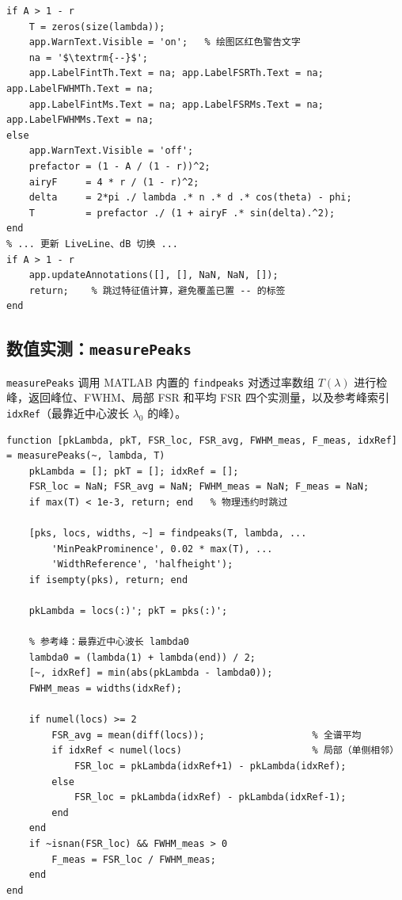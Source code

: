 \documentclass[10.5pt]{config}
\begin{document}
\begin{listing}[H]
\begin{verbatim}
if A > 1 - r
    T = zeros(size(lambda));
    app.WarnText.Visible = 'on';   % 绘图区红色警告文字
    na = '$\textrm{--}$';
    app.LabelFintTh.Text = na; app.LabelFSRTh.Text = na; app.LabelFWHMTh.Text = na;
    app.LabelFintMs.Text = na; app.LabelFSRMs.Text = na; app.LabelFWHMMs.Text = na;
else
    app.WarnText.Visible = 'off';
    prefactor = (1 - A / (1 - r))^2;
    airyF     = 4 * r / (1 - r)^2;
    delta     = 2*pi ./ lambda .* n .* d .* cos(theta) - phi;
    T         = prefactor ./ (1 + airyF .* sin(delta).^2);
end
% ... 更新 LiveLine、dB 切换 ...
if A > 1 - r
    app.updateAnnotations([], [], NaN, NaN, []);
    return;    % 跳过特征值计算，避免覆盖已置 -- 的标签
end
\end{verbatim}
\caption{物理合法性守卫：$A>1-r$ 时输出零线、显示警告并提前返回\label{lst:guard}}
\end{listing}

\subsection{数值实测：\texttt{measurePeaks}}
\label{ssec:measure}

\texttt{measurePeaks} 调用 MATLAB 内置的 \texttt{findpeaks} 对透过率数组 $T(\lambda)$ 进行检峰，返回峰位、FWHM、局部 FSR 和平均 FSR 四个实测量，以及参考峰索引 \texttt{idxRef}（最靠近中心波长 $\lambda_0$ 的峰）。

\begin{listing}[H]
\begin{verbatim}
function [pkLambda, pkT, FSR_loc, FSR_avg, FWHM_meas, F_meas, idxRef] = measurePeaks(~, lambda, T)
    pkLambda = []; pkT = []; idxRef = [];
    FSR_loc = NaN; FSR_avg = NaN; FWHM_meas = NaN; F_meas = NaN;
    if max(T) < 1e-3, return; end   % 物理违约时跳过

    [pks, locs, widths, ~] = findpeaks(T, lambda, ...
        'MinPeakProminence', 0.02 * max(T), ...
        'WidthReference', 'halfheight');
    if isempty(pks), return; end

    pkLambda = locs(:)'; pkT = pks(:)';

    % 参考峰：最靠近中心波长 lambda0
    lambda0 = (lambda(1) + lambda(end)) / 2;
    [~, idxRef] = min(abs(pkLambda - lambda0));
    FWHM_meas = widths(idxRef);

    if numel(locs) >= 2
        FSR_avg = mean(diff(locs));                   % 全谱平均
        if idxRef < numel(locs)                       % 局部（单侧相邻）
            FSR_loc = pkLambda(idxRef+1) - pkLambda(idxRef);
        else
            FSR_loc = pkLambda(idxRef) - pkLambda(idxRef-1);
        end
    end
    if ~isnan(FSR_loc) && FWHM_meas > 0
        F_meas = FSR_loc / FWHM_meas;
    end
end
\end{verbatim}
\caption{\texttt{measurePeaks}：以参考峰为基准实测 FSR、FWHM 与精细度，避免宽波段 $\mathrm{FSR}\propto\lambda^{2}$ 色散对全局平均的干扰}
\end{listing}
\end{document}
